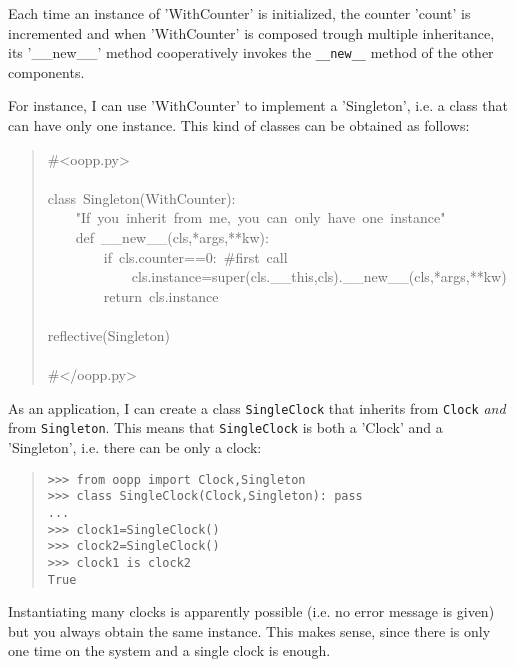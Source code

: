 \documentclass[10pt,english]{article}
\begin{document}
Each time an instance of 'WithCounter' is initialized, the counter 'count' is
incremented and when 'WithCounter' is composed trough multiple inheritance, 
its '{\_}{\_}new{\_}{\_}'  method cooperatively invokes the \texttt{{\_}{\_}new{\_}{\_}} method 
of the other components.

For instance, I can use 'WithCounter' to implement a 'Singleton', i.e. 
a class that can have only one instance. This kind of classes can be
obtained as follows:
\begin{quote}
\begin{ttfamily}\begin{flushleft}
\mbox{{\#}<oopp.py>}\\
\mbox{}\\
\mbox{class~Singleton(WithCounter):}\\
\mbox{~~~~"If~you~inherit~from~me,~you~can~only~have~one~instance"}\\
\mbox{~~~~def~{\_}{\_}new{\_}{\_}(cls,*args,**kw):}\\
\mbox{~~~~~~~~if~cls.counter==0:~{\#}first~call}\\
\mbox{~~~~~~~~~~~~cls.instance=super(cls.{\_}{\_}this,cls).{\_}{\_}new{\_}{\_}(cls,*args,**kw)}\\
\mbox{~~~~~~~~return~cls.instance}\\
\mbox{}\\
\mbox{reflective(Singleton)}\\
\mbox{}\\
\mbox{{\#}</oopp.py>}
\end{flushleft}\end{ttfamily}
\end{quote}

As an application, I can create a 
class \texttt{SingleClock} that inherits from \texttt{Clock} 
\emph{and} from \texttt{Singleton}. This means that \texttt{SingleClock} is both a 
'Clock' and a 'Singleton', i.e. there can be only a clock:
\begin{quote}
\begin{verbatim}>>> from oopp import Clock,Singleton
>>> class SingleClock(Clock,Singleton): pass
...
>>> clock1=SingleClock()
>>> clock2=SingleClock()
>>> clock1 is clock2
True\end{verbatim}
\end{quote}

Instantiating many clocks is apparently possible (i.e. no error
message is given) but you always obtain the same instance. This makes
sense, since there is only one time on the system and a single
clock is enough.
\end{document}

